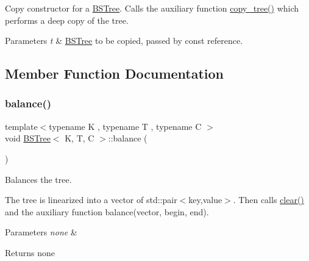 Copy constructor for a \hyperlink{class_b_s_tree}{B\+S\+Tree}. Calls the auxiliary function \hyperlink{class_b_s_tree_ad34bd4cfe46ab5a5376cc242b1901f2b}{copy\+\_\+tree()} which performs a deep copy of the tree. 


\begin{DoxyParams}{Parameters}
{\em t} & \hyperlink{class_b_s_tree}{B\+S\+Tree} to be copied, passed by const reference. \\
\hline
\end{DoxyParams}


\subsection{Member Function Documentation}
\mbox{\label{class_b_s_tree_a955848e883b93312a467c0ee103db8df}} 
\subsubsection{\texorpdfstring{balance()}{balance()}\hspace{0.1cm}{\footnotesize\ttfamily [1/2]}}
{\footnotesize\ttfamily template$<$typename K , typename T , typename C $>$ \\
void \hyperlink{class_b_s_tree}{B\+S\+Tree}$<$ K, T, C $>$\+::balance (\begin{DoxyParamCaption}{ }\end{DoxyParamCaption})}



Balances the tree. 

The tree is linearized into a vector of std\+::pair$<$key,value$>$. Then calls \hyperlink{class_b_s_tree_ae5362c45ed2bc96c9c72fdef689bd078}{clear()} and the auxiliary function balance(vector, begin, end).


\begin{DoxyParams}{Parameters}
{\em none} & \\
\hline
\end{DoxyParams}
\begin{DoxyReturn}{Returns}
none 
\end{DoxyReturn}
\mbox{\label{class_b_s_tree_a3ae6d9b52f23edb005289f52200b0b70}} 

